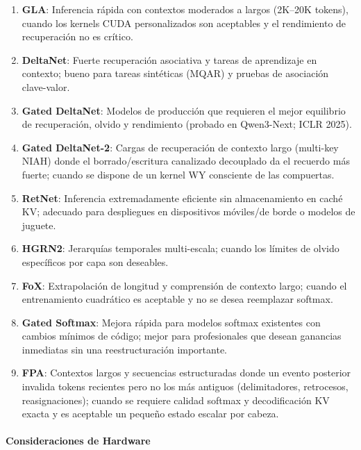 \begin{enumerate}[leftmargin=*]
    \item \textbf{GLA}: Inferencia rápida con contextos moderados a largos (2K--20K tokens), cuando los kernels CUDA personalizados son aceptables y el rendimiento de recuperación no es crítico.
    \item \textbf{DeltaNet}: Fuerte recuperación asociativa y tareas de aprendizaje en contexto; bueno para tareas sintéticas (MQAR) y pruebas de asociación clave-valor.
    \item \textbf{Gated DeltaNet}: Modelos de producción que requieren el mejor equilibrio de recuperación, olvido y rendimiento (probado en Qwen3-Next; ICLR 2025).
    \item \textbf{Gated DeltaNet-2}: Cargas de recuperación de contexto largo (multi-key NIAH) donde el borrado/escritura canalizado decouplado da el recuerdo más fuerte; cuando se dispone de un kernel WY consciente de las compuertas.
    \item \textbf{RetNet}: Inferencia extremadamente eficiente sin almacenamiento en caché KV; adecuado para despliegues en dispositivos móviles/de borde o modelos de juguete.
    \item \textbf{HGRN2}: Jerarquías temporales multi-escala; cuando los límites de olvido específicos por capa son deseables.
    \item \textbf{FoX}: Extrapolación de longitud y comprensión de contexto largo; cuando el entrenamiento cuadrático es aceptable y no se desea reemplazar softmax.
    \item \textbf{Gated Softmax}: Mejora rápida para modelos softmax existentes con cambios mínimos de código; mejor para profesionales que desean ganancias inmediatas sin una reestructuración importante.
    \item \textbf{FPA}: Contextos largos y secuencias estructuradas donde un evento posterior invalida tokens recientes pero no los más antiguos (delimitadores, retrocesos, reasignaciones); cuando se requiere calidad softmax y decodificación KV exacta y es aceptable un pequeño estado escalar por cabeza.
\end{enumerate}

\paragraph{Consideraciones de Hardware}

